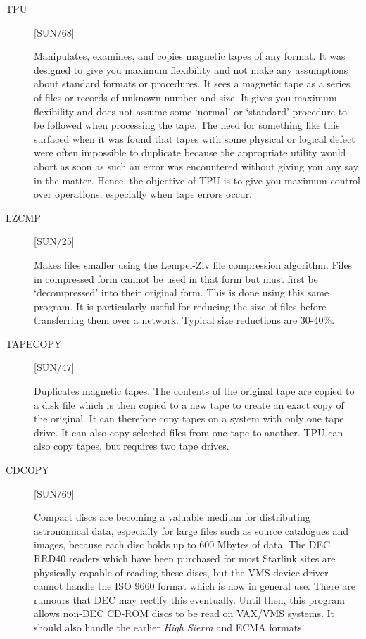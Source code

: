 \begin{description}

\item [TPU] \hfill [SUN/68]

Manipulates, examines, and copies magnetic tapes of any format.
It was designed to give you maximum flexibility and not make any assumptions
about standard formats or procedures.
It sees a magnetic tape as a series of files or records of unknown number
and size.
It gives you maximum flexibility and does not assume some `normal' or `standard'
procedure to be followed when processing the tape.
The need for something like this surfaced when it was found that tapes with some
physical or logical defect were often impossible to duplicate because the
appropriate utility would abort as soon as such an error was encountered without
giving you any say in the matter.
Hence, the objective of TPU is to give you maximum control over operations,
especially when tape errors occur.

\item [LZCMP] \hfill [SUN/25]

Makes files smaller using the Lempel-Ziv file compression algorithm.
Files in compressed form cannot be used in that form but must first be
`decompressed' into their original form.
This is done using this same program.
It is particularly useful for reducing the size of files before transferring
them over a network.
Typical size reductions are 30-40\%.

\item [TAPECOPY] \hfill [SUN/47]

Duplicates magnetic tapes.
The contents of the original tape are copied to a disk file which is then
copied to a new tape to create an exact copy of the original.
It can therefore copy tapes on a system with only one tape drive.
It can also copy selected files from one tape to another.
TPU can also copy tapes, but requires two tape drives.

\item [CDCOPY] \hfill [SUN/69]

Compact discs are becoming a valuable medium for distributing astronomical data,
especially for large files such as source catalogues and images, because each
disc holds up to 600 Mbytes of data.
The DEC RRD40 readers which have been purchased for most Starlink sites are
physically capable of reading these discs, but the VMS device driver
cannot handle the ISO 9660 format which is now in general use.
There are rumours that DEC may rectify this eventually.
Until then, this program allows non-DEC CD-ROM discs to be read on VAX/VMS
systems. 
It should also handle the earlier {\it High Sierra} and ECMA formats. 


\end{description}
